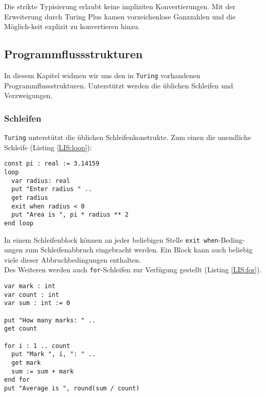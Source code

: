 Die strikte Typisierung erlaubt keine impliziten Konvertierungen. Mit der Erweiterung durch Turing Plus kamen vorzeichenlose Ganzzahlen und die M\"oglich-keit explizit zu konvertieren hinzu.

\subsection{Programmflussstrukturen}

In diesem Kapitel widmen wir uns den in \texttt{Turing} vorhandenen Programmflussstrukturen. Unterst\"utzt werden die \"ublichen Schleifen und Verzweigungen.

\subsubsection{Schleifen}

\texttt{Turing} unterst\"utzt die \"ublichen Schleifenkonstrukte. Zum einen die unendliche Schleife (Listing \ref{LIS:loop}):

\lstset{label=LIS:loop}
\begin{table}[h!]
\begin{lstlisting}
const pi : real := 3.14159
loop
  var radius: real
  put "Enter radius " ..
  get radius
  exit when radius < 0
  put "Area is ", pi * radius ** 2
end loop
\end{lstlisting}
\end{table}

In einem Schleifenblock k\"onnen an jeder beliebigen Stelle \lstinline{exit when}-Beding-ungen zum Schleifenabbruch eingebracht werden. Ein Block kann auch beliebig viele dieser Abbruchbedingungen enthalten. \\  
Des Weiteren werden auch \lstinline{for}-Schleifen zur Verf\"ugung gestellt (Listing \ref{LIS:for}).

\lstset{label=LIS:for}
\begin{table}[h!]
\begin{lstlisting}
var mark : int
var count : int
var sum : int := 0

put "How many marks: " ..
get count

for i : 1 .. count
  put "Mark ", i, ": " ..
  get mark
  sum := sum + mark
end for
put "Average is ", round(sum / count)
\end{lstlisting}
\end{table}

